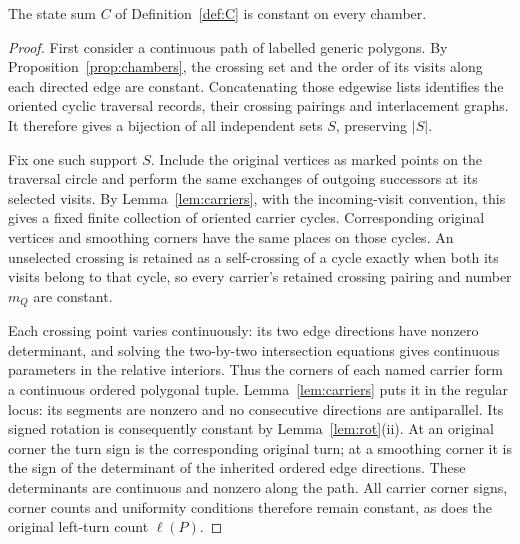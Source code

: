 \begin{proposition}\label{prop:C-chamber}
The state sum $C$ of Definition~\ref{def:C} is constant on every chamber.
\end{proposition}
\begin{proof}
First consider a continuous path of labelled generic polygons. By
Proposition~\ref{prop:chambers}, the crossing set and the order of its
visits along each directed edge are constant. Concatenating those edgewise
lists identifies the oriented cyclic traversal records, their crossing
pairings and interlacement graphs. It therefore gives a bijection of all
independent sets $S$, preserving $|S|$.

Fix one such support $S$. Include the original vertices as marked points
on the traversal circle and perform the same exchanges of outgoing
successors at its selected visits. By Lemma~\ref{lem:carriers}, with the
incoming-visit convention, this gives a fixed finite collection of oriented
carrier cycles. Corresponding original vertices and smoothing corners
have the same places on those cycles. An unselected crossing is retained
as a self-crossing of a cycle exactly when both its visits belong to that
cycle, so every carrier's retained crossing pairing and number $m_Q$ are
constant.

Each crossing point varies continuously: its two edge directions have
nonzero determinant, and solving the two-by-two intersection equations
gives continuous parameters in the relative interiors. Thus the corners
of each named carrier form a continuous ordered polygonal tuple.
Lemma~\ref{lem:carriers} puts it in the regular locus: its segments are
nonzero and no consecutive directions are antiparallel. Its signed
rotation is consequently constant by Lemma~\ref{lem:rot}(ii).
At an original corner the turn sign is the corresponding original turn;
at a smoothing corner it is the sign of the determinant of the inherited
ordered edge directions. These determinants are continuous and nonzero
along the path. All carrier corner signs, corner counts and uniformity
conditions therefore remain constant, as does the original left-turn
count $\ell(P)$.


\end{proof}

